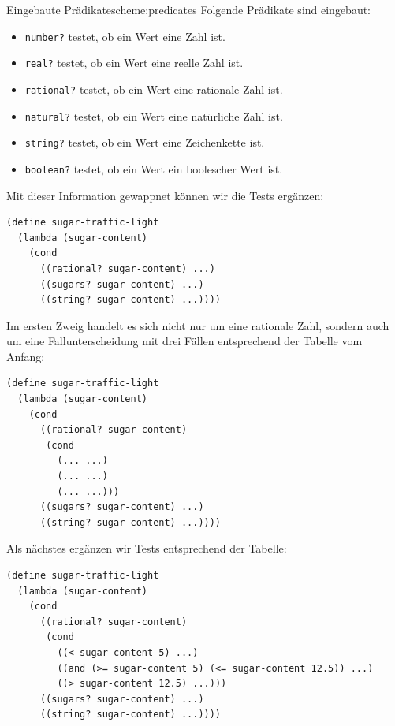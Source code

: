 \begin{feature}{Eingebaute Prädikate}{scheme:predicates}
  Folgende Prädikate sind eingebaut:
  \begin{itemize}
  \item \lstinline{number?} testet, ob ein Wert eine Zahl ist.
  \item \lstinline{real?} testet, ob ein Wert eine reelle Zahl ist.
  \item \lstinline{rational?} testet, ob ein Wert eine rationale Zahl ist.
  \item \lstinline{natural?} testet, ob ein Wert eine natürliche Zahl ist.
  \item \lstinline{string?} testet, ob ein Wert eine Zeichenkette ist.
  \item \lstinline{boolean?} testet, ob ein Wert ein boolescher Wert ist.
  \end{itemize}
\end{feature}
%
Mit dieser Information gewappnet können wir die Tests ergänzen:
%
\begin{lstlisting}
(define sugar-traffic-light
  (lambda (sugar-content)
    (cond
      ((rational? sugar-content) ...)
      ((sugars? sugar-content) ...)
      ((string? sugar-content) ...))))
\end{lstlisting}         
%
Im ersten Zweig handelt es sich nicht nur um eine rationale Zahl,
sondern auch um eine Fallunterscheidung mit drei Fällen entsprechend
der Tabelle vom Anfang:
%
\begin{lstlisting}
(define sugar-traffic-light
  (lambda (sugar-content)
    (cond
      ((rational? sugar-content) 
       (cond
         (... ...)
         (... ...)
         (... ...)))
      ((sugars? sugar-content) ...)
      ((string? sugar-content) ...))))
\end{lstlisting}         
%
Als nächstes ergänzen wir Tests entsprechend der Tabelle:
%
\begin{lstlisting}
(define sugar-traffic-light
  (lambda (sugar-content)
    (cond
      ((rational? sugar-content) 
       (cond
         ((< sugar-content 5) ...)
         ((and (>= sugar-content 5) (<= sugar-content 12.5)) ...)
         ((> sugar-content 12.5) ...)))
      ((sugars? sugar-content) ...)
      ((string? sugar-content) ...))))
\end{lstlisting}         
